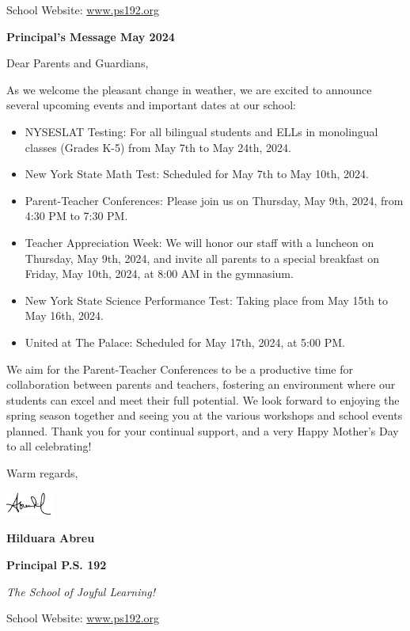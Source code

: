 \documentclass[12pt,letterpaper]{article}
\begin{document}
\vspace*{0.5in}
School Website: \href{https://www.ps192.org}{www.ps192.org}

\textbf{Principal's Message May 2024}

Dear Parents and Guardians,

As we welcome the pleasant change in weather, we are excited to announce several upcoming events and
important dates at our school:
\begin{itemize}
\item NYSESLAT Testing: For all bilingual students and ELLs in monolingual classes (Grades K-5) from
May 7th to May 24th, 2024.
\item New York State Math Test: Scheduled for May 7th to May 10th, 2024.
\item Parent-Teacher Conferences: Please join us on Thursday, May 9th, 2024, from 4:30 PM to 7:30 PM.
\item Teacher Appreciation Week: We will honor our staff with a luncheon on Thursday, May 9th, 2024, and invite all parents to a special breakfast on Friday, May 10th, 2024, at 8:00 AM in the gymnasium.
\item New York State Science Performance Test: Taking place from May 15th to May 16th, 2024.
\item United at The Palace: Scheduled for May 17th, 2024, at 5:00 PM.
\end{itemize} 
We aim for the Parent-Teacher Conferences to be a productive time for collaboration between parents and
teachers, fostering an environment where our students can excel and meet their full potential. We look
\pagebreak
\vspace*{0.7in}
forward to enjoying the spring season together and seeing you at the various workshops and school
events planned. Thank you for your continual support, and a very Happy Mother’s Day to all celebrating!

Warm regards, 

\includegraphics[width=0.12\textwidth]{hil_signature}

\textbf{Hilduara Abreu}

\textbf{Principal P.S. 192}

\textit{The School of Joyful Learning!}
\pagebreak
\vspace*{0.7in}

School Website: \href{https://www.ps192.org}{www.ps192.org}
\end{document}
